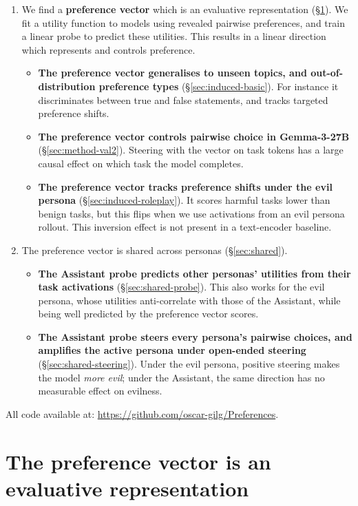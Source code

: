 \documentclass{article}
\begin{document}
\begin{enumerate}
\item We find a \textbf{preference vector} which is an evaluative representation (\S\ref{sec:method}). We fit a utility function to models using revealed pairwise preferences, and train a linear probe to predict these utilities. This results in a linear direction which represents and controls preference.
\begin{itemize}
    \item \textbf{The preference vector generalises to unseen topics, and out-of-distribution preference types} (\S\ref{sec:induced-basic}). For instance it discriminates between true and false statements, and tracks targeted preference shifts.
    \item \textbf{The preference vector controls pairwise choice in Gemma-3-27B} (\S\ref{sec:method-val2}). Steering with the vector on task tokens has a large causal effect on which task the model completes.
    \item \textbf{The preference vector tracks preference shifts under the evil persona} (\S\ref{sec:induced-roleplay}). It scores harmful tasks lower than benign tasks, but this flips when we use activations from an evil persona rollout. This inversion effect is not present in a text-encoder baseline.
\end{itemize}
\item The preference vector is shared across personas (\S\ref{sec:shared}).
\begin{itemize}
    \item \textbf{The Assistant probe predicts other personas' utilities from their task activations} (\S\ref{sec:shared-probe}). This also works for the evil persona, whose utilities anti-correlate with those of the Assistant, while being well predicted by the preference vector scores.
    \item \textbf{The Assistant probe steers every persona's pairwise choices, and amplifies the active persona under open-ended steering} (\S\ref{sec:shared-steering}). Under the evil persona, positive steering makes the model \textit{more evil}; under the Assistant, the same direction has no measurable effect on evilness.
\end{itemize}
\end{enumerate}

All code available at: \url{https://github.com/oscar-gilg/Preferences}.

\section{The preference vector is an evaluative representation}
\label{sec:method}
\end{document}
